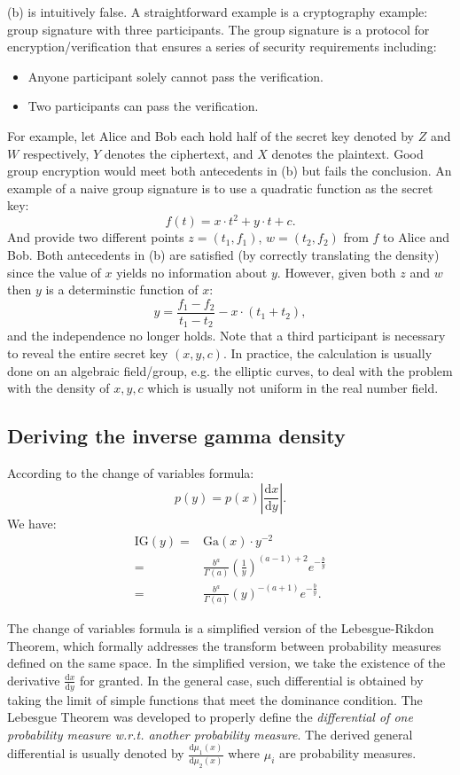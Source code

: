 \documentclass[UTF8]{ctexart}
\begin{document}
(b) is intuitively false.
A straightforward example is a cryptography example: group signature with three participants.
The group signature is a protocol for encryption/verification that ensures a series of security requirements including:
\begin{itemize}
\item Anyone participant solely cannot pass the verification.
\item Two participants can pass the verification.
\end{itemize}
For example, let Alice and Bob each hold half of the secret key denoted by $Z$ and $W$ respectively, $Y$ denotes the ciphertext, and $X$ denotes the plaintext.
Good group encryption would meet both antecedents in (b) but fails the conclusion.
An example of a naive group signature is to use a quadratic function as the secret key:
$$f(t)=x\cdot t^{2}+y\cdot t +c.$$
And provide two different points $z=(t_{1},f_{1})$, $w=(t_{2},f_{2})$ from $f$ to Alice and Bob.
Both antecedents in (b) are satisfied (by correctly translating the density) since the value of $x$ yields no information about $y$.
However, given both $z$ and $w$ then $y$ is a determinstic function of $x$:
$$y=\frac{f_{1}-f_{2}}{t_{1}-t_{2}}-x\cdot(t_{1}+t_{2}),$$
and the independence no longer holds.
Note that a third participant is necessary to reveal the entire secret key $(x,y,c)$.
In practice, the calculation is usually done on an algebraic field/group, e.g. the elliptic curves, to deal with the problem with the density of $x,y,c$ which is usually not uniform in the real number field.

\subsection{Deriving the inverse gamma density}
According to the change of variables formula:
$$p(y)=p(x)|\frac{\text{d}x}{\text{d}y}|.$$
We have:
\begin{align}
\text{IG}(y)=&\text{Ga}(x)\cdot y^{-2} \nonumber \\
=&\frac{b^{a}}{\Gamma(a)}(\frac{1}{y})^{(a-1)+2}e^{-\frac{b}{y}} \nonumber \\
=&\frac{b^{a}}{\Gamma(a)}(y)^{-(a+1)}e^{-\frac{b}{y}}. \nonumber
\end{align}

The change of variables formula is a simplified version of the Lebesgue-Rikdon Theorem, which formally addresses the transform between probability measures defined on the same space.
In the simplified version, we take the existence of the derivative $\frac{\text{d}x}{\text{d}y}$ for granted.
In the general case, such differential is obtained by taking the limit of simple functions that meet the dominance condition.
The Lebesgue Theorem was developed to properly define the \emph{differential of one probability measure w.r.t. another probability measure}.
The derived general differential is usually denoted by $\frac{\text{d}\mu_{1}(x)}{\text{d}\mu_{2}(x)}$ where $\mu_{i}$ are probability measures.
\end{document}
